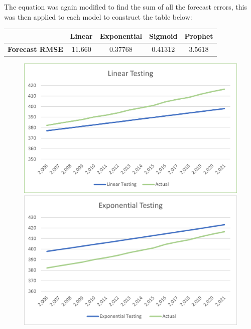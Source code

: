 \documentclass[12pt]{mcmthesis}
\begin{document}
    The equation was again modified to find the sum of all the forecast errors, this was then applied to each model to construct the table below:
%
    \begin{center}
        \begin{tabular}{ |c|c|c|c|c|}
            \hline
            & \textbf{Linear} & \textbf{Exponential} & \textbf{Sigmoid} & \textbf{Prophet} \\
            \hline
            \textbf{Forecast RMSE} & 11.660          & 0.37768                & 0.41312            & 3.5618            \\
            \hline
        \end{tabular}
    \end{center}

    \begin{figure}
        \centering
        \begin{minipage}{0.5\linewidth}
            \centering
            \includegraphics[width=\textwidth]{linear_testing}
        \end{minipage}%
        \begin{minipage}{0.5\linewidth}
            \centering
            \includegraphics[width=\textwidth]{exponential_testing}
        \end{minipage}
    \end{figure}%
\end{document}
